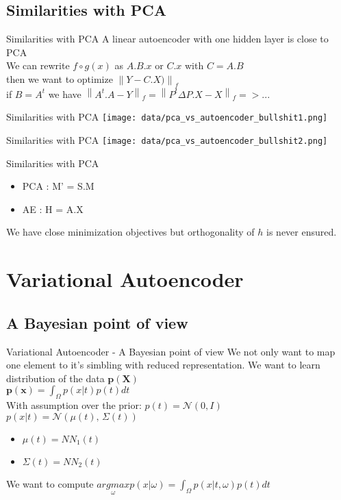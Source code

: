 \documentclass{beamer}
\newcommand{\norm}[1]{\left\lVert#1\right\rVert}
\begin{document}
\subsection{Similarities with PCA}
\begin{frame}{Similarities with PCA}
	A linear autoencoder with one hidden layer is close to PCA\\
	We can rewrite $ f \circ g (x)$ as $A.B.x$ or $C.x$ with $C = A.B$\\
	then we want to optimize $\norm{ Y - C.X)}_f$ \\ 
	if $B = A^{t}$ we have $\norm{A^{t}.A - Y}_f = \norm{ P^t \Delta P. X - X}_f => ... $
\end{frame}

\begin{frame}{Similarities with PCA}
    \texttt{[image: data/pca\_vs\_autoencoder\_bullshit1.png]}
\end{frame}

\begin{frame}{Similarities with PCA}
    \texttt{[image: data/pca\_vs\_autoencoder\_bullshit2.png]}
\end{frame}

\begin{frame}{Similarities with PCA}
	\begin{itemize}
		\item PCA : M' = S.M  
		\item AE : H = A.X
	\end{itemize}
We have close minimization objectives but orthogonality of $h$ is never ensured.
%
\end{frame}

\section{Variational Autoencoder}
\subsection{A Bayesian point of view}
\begin{frame}{Variational Autoencoder - A Bayesian point of view}
    We not only want to map one element to it's simbling with reduced representation.
    We want to learn distribution of the data $\mathbf{p(X)}$ \\
    $ \mathbf{p(x)} = \int_\Omega p(x|t)p(t) dt$  \\
	With assumption over the prior: $p(t) = \mathcal{N}(0, I)$ \\
	$ p(x| t) = \mathcal{N}(\mu(t),\,\Sigma(t))$ \\
	\begin{itemize}
		\item $ \mu(t) = NN_1(t)$
		\item $ \Sigma(t) = NN_2(t)$
	\end{itemize}
	We want to compute $\underset{\omega}{argmax} p(x| \omega) = \int_\Omega p(x|t, \omega)p(t) dt$  \\
\end{frame}
\end{document}
